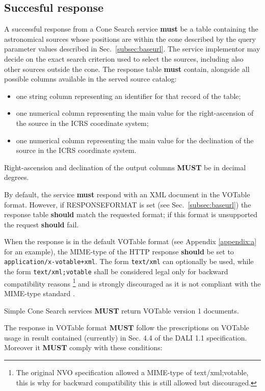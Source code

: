 \documentclass[11pt,a4paper]{ivoa}
\begin{document}
\subsection{Succesful response}
\label{subsec:response}

A successful response from a Cone Search service \textbf{must} be a
table containing the astronomical sources whose positions are within the
cone described by the query parameter values described in
Sec.~\ref{subsec:baseurl}. The service implementor may decide on the exact
search criterion used to select the sources, including also other
sources outside the cone.
The response table \textbf{must} contain, alongside all possible columns
available in the served source catalog:
\begin{itemize}
	\item one string column representing an identifier for that record of the table;
	\item one numerical column representing the main value for the
		right-ascension of the source in the ICRS coordinate system;
	\item one numerical column representing the main value for the
		declination of the source in the ICRS coordinate system.
\end{itemize}
Right-ascension and declination of the output columns \textbf{MUST} be in decimal degrees.

By default, the service \textbf{must} respond with an XML document in the
VOTable\citep{2025ivoa.spec.0116O} format. However, if RESPONSEFORMAT is
set (see Sec.~\ref{subsec:baseurl}) the response table \textbf{should}
match the requested format; if this format is unsupported the request
\textbf{should} fail.

When the response is in the default VOTable format (see Appendix \ref{appendix:a}
for an example), the MIME-type of the HTTP response \textbf{should} be
set to \texttt{application/x-votable+xml}. The form
\texttt{text/xml} can optionally be used, while the
form \texttt{text/xml;votable} shall be considered legal
only for backward compatibility reasons
\footnote{
	The original NVO specification allowed a MIME-type of text/xml;votable,
	this is why for backward compatibility this is still allowed but discouraged.
}
and is strongly discouraged as it is not compliant with the MIME-type
standard \citep{std:MIME}. 

Simple Cone Search services \textbf{MUST} return VOTable
version 1 documents.

The response in VOTable format \textbf{MUST} follow the prescriptions on
VOTable usage in result contained (currently) in Sec. 4.4 of the DALI 1.1
specification. Moreover it \textbf{MUST} comply with these conditions:
\end{document}

